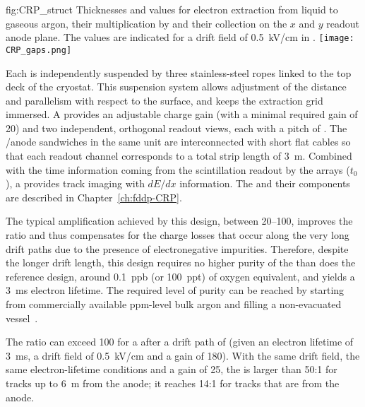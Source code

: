 \begin{dunefigure}{fig:CRP_struct}
{Thicknesses and  values for electron extraction from liquid to gaseous argon, their  multiplication by  and their collection on the $x$ and $y$ readout anode plane. The  values are indicated for a drift field of \SI{0.5}{kV/cm} in \lar.}
\texttt{[image: CRP\_gaps.png]}
\end{dunefigure}

Each  is independently suspended by three stainless-steel ropes linked to the top deck of the cryostat. This suspension system allows adjustment of the  distance and parallelism with respect to the \lar surface, and keeps the extraction grid immersed. A  provides an adjustable charge gain (with a minimal required gain of \num{20}) and two independent, orthogonal readout views, each with a pitch of \dpstrippitch.  The /anode sandwiches  in the same  unit are interconnected with short flat cables so that each readout channel corresponds to a total strip length of \SI{3}{m}. Combined with the time information coming from the \lar scintillation readout by the  arrays ($t_0$), a  provides \threed track imaging with $dE/dx$ information.  The  and their components are described in Chapter~\ref{ch:fddp-CRP}.

The typical amplification achieved by this design, between \numrange{20}{100}, improves the  ratio and thus  compensates for the charge losses that occur along the very long drift paths due to the presence of  electronegative impurities. Therefore, despite the longer drift length, this design requires no higher 
purity of the \lar than does the reference design, around \SI{0.1}{ppb} (or \SI{100}{ppt}) of oxygen equivalent, and yields a \SI{3}{ms} electron lifetime. The required level of purity can be reached by starting from  commercially available ppm-level bulk argon and filling a non-evacuated vessel~\cite{WA105_TDR}.

The  ratio can exceed \num{100} for a  after a drift path of %
\dpmaxdrift (given an electron lifetime of \SI{3}{ms}, a drift field of \SI{0.5}{kV/cm} and a  gain of \num{180}). With the same drift field, the same electron-lifetime conditions and a  gain of \num{25}, the  is larger than \num{50}:\num{1} for tracks up to \SI{6}{m} from the anode; it reaches \num{14}:\num{1} for  tracks that are \dpmaxdrift from the anode.

